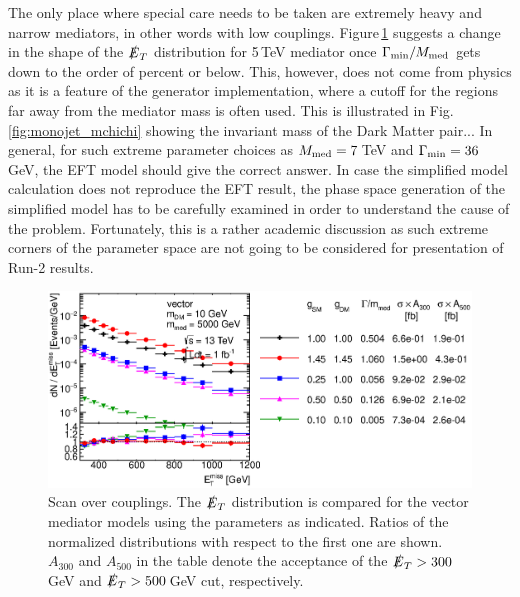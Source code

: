 The only place where special care needs to be taken are extremely heavy and narrow mediators, in other words with low couplings. Figure\,\ref{fig:monojet_narrow} suggests a change in the shape of the $\slashed{E}_T$ distribution for 5\,TeV mediator once $\Gamma_{\rm{min}}/M_{\rm{med}}$ gets down to the order of percent or below.
This, however, does not come from physics as it is a feature of the generator implementation, where a cutoff for the regions far away from the mediator mass is often used. This is illustrated in Fig.\,\ref{fig:monojet_mchichi} showing the invariant mass of the Dark Matter pair...
In general, for such extreme parameter choices as $M_{\rm{med}}=7$\,TeV and $\Gamma_{\rm{min}}=36$\,GeV, the EFT model should give the correct answer. In case the simplified model calculation does not reproduce the EFT result, the phase space generation of the simplified model has to be carefully examined in order to understand the cause of the problem. Fortunately, this is a rather academic discussion as such extreme corners of the parameter space are not going to be considered for presentation of Run-2 results.

%
%

\begin{figure}
\centering
\includegraphics[width=0.9\linewidth]{figures/monojet/scan_g_V_10_5000.eps}
\caption{Scan over couplings. The $\slashed{E}_T$ distribution is compared for the vector mediator models using the parameters as indicated. Ratios of the normalized distributions with respect to the first one are shown. $A_{300}$ and $A_{500}$ in the table denote the acceptance of the $\slashed{E}_T>300$\,GeV and $\slashed{E}_T>500$\,GeV cut, respectively.}
\label{fig:monojet_narrow}
\end{figure}


